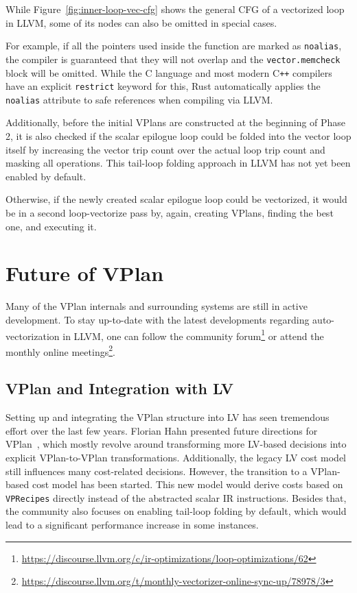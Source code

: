 \documentclass[sigplan,11pt,nonacm]{acmart}
\begin{document}
While Figure~\ref{fig:inner-loop-vec-cfg} shows the general CFG of a vectorized loop in LLVM, some 
of its nodes can also be omitted in special cases.

For example, if all the pointers used inside the function are marked as \texttt{noalias}, the compiler 
is guaranteed that they will not overlap and the \texttt{vector.memcheck} block will be omitted.
While the C language and most modern C\texttt{++} compilers have an explicit \texttt{restrict} keyword for this,
Rust automatically applies the \texttt{noalias} attribute to safe references when compiling via LLVM.

Additionally, before the initial VPlans are constructed at the beginning of Phase 2, it is also checked if 
the scalar epilogue loop could be folded into the vector loop itself by increasing the vector 
trip count over the actual loop trip count and masking all operations. This tail-loop folding approach in LLVM 
has not yet been enabled by default.

Otherwise, if the newly created scalar epilogue loop could be vectorized, it would be in a second loop-vectorize 
pass by, again, creating VPlans, finding the best one, and executing it.

\section{Future of VPlan}
\label{sec:vplanfuture}

Many of the VPlan internals and surrounding systems are still in active development. To stay up-to-date 
with the latest developments regarding auto-vectorization in LLVM, one can follow the 
community forum\footnote{\url{https://discourse.llvm.org/c/ir-optimizations/loop-optimizations/62}} or
attend the monthly online 
meetings\footnote{\url{https://discourse.llvm.org/t/monthly-vectorizer-online-sync-up/78978/3}}.

\subsection{VPlan and Integration with LV}
Setting up and integrating the VPlan structure into LV has seen tremendous effort over the last 
few years. Florian Hahn presented future directions for 
VPlan~\cite{llvmvplanupdate}, which mostly revolve around transforming more LV-based decisions into
explicit VPlan-to-VPlan transformations. Additionally, the legacy LV cost model still influences 
many cost-related decisions. However, the transition to a VPlan-based cost model has been 
started. This new model would derive costs based on \texttt{VPRecipes} directly instead of the 
abstracted scalar IR instructions. Besides that, the community also focuses on enabling tail-loop folding by
default, which would lead to a significant performance increase in some instances.
\end{document}
